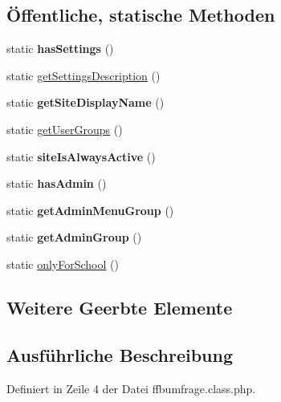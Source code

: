 \subsection*{Öffentliche, statische Methoden}
\begin{DoxyCompactItemize}
\item 
\mbox{\label{classffbumfrage_a09ac4ded1bf0ba6775eb050a7fc9684f}} 
static {\bfseries has\+Settings} ()
\item 
static \mbox{\hyperlink{classffbumfrage_a27ad7a611a7eea6e9fadd4c33764398d}{get\+Settings\+Description}} ()
\item 
\mbox{\label{classffbumfrage_aba664f59cad568306724f4a128077c6b}} 
static {\bfseries get\+Site\+Display\+Name} ()
\item 
static \mbox{\hyperlink{classffbumfrage_ac1a0a07f9e073f2cb3a9a48b9391d74c}{get\+User\+Groups}} ()
\item 
\mbox{\label{classffbumfrage_ae465e9d90973c8d876a948043a9d47f0}} 
static {\bfseries site\+Is\+Always\+Active} ()
\item 
\mbox{\label{classffbumfrage_a72bd51d9b924600c1862c63bd56b8fac}} 
static {\bfseries has\+Admin} ()
\item 
\mbox{\label{classffbumfrage_add6729b5e5321de2e4173c47314deeb6}} 
static {\bfseries get\+Admin\+Menu\+Group} ()
\item 
\mbox{\label{classffbumfrage_aa2c67cc27f8218fab3b3031013a5b0b8}} 
static {\bfseries get\+Admin\+Group} ()
\item 
static \mbox{\hyperlink{classffbumfrage_a8949df54c849cac6e2cf3cd5504d7675}{only\+For\+School}} ()
\end{DoxyCompactItemize}
\subsection*{Weitere Geerbte Elemente}


\subsection{Ausführliche Beschreibung}


Definiert in Zeile 4 der Datei ffbumfrage.\+class.\+php.



